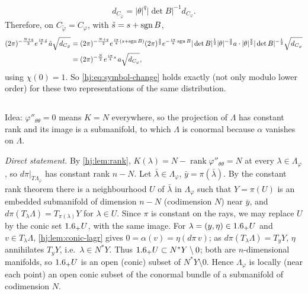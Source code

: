 \begin{equation*}
d_{C_{\tilde\varphi}}=|\theta|^q|\det B|^{-1}d_{C_\varphi}.
\end{equation*}
Therefore, on $C_{\tilde\varphi}=C_\varphi$, with $\tilde s=s+\operatorname{sgn} B$,
\begin{align*}
(2\pi)^{-\frac{N+q}2}e^{\frac{i\pi}4\tilde s}\,\tilde a\sqrt{d_{C_{\tilde\varphi}}}
&=(2\pi)^{-\frac{N+q}2}e^{\frac{i\pi}4(s+\operatorname{sgn} B)}(2\pi)^{\frac q2}e^{-\frac{i\pi}4\operatorname{sgn} B}
|\det B|^{\frac12}|\theta|^{-\frac q2}a\cdot|\theta|^{\frac q2}|\det B|^{-\frac12}
\sqrt{d_{C_\varphi}}\\
&=(2\pi)^{-\frac N2}e^{\frac{i\pi}4s}\,a\sqrt{d_{C_\varphi}},
\end{align*}
using $\chi(0)=1$. So \eqref{hj:eq:symbol-change} holds exactly (not only modulo lower order)
for these two representations of the same distribution.

\subsection*{}
Idea: $\varphi''_{\theta\theta}=0$ means $K=N$ everywhere, so the projection of $\Lambda$ has
constant rank and its image is a submanifold, to which $\Lambda$ is conormal because $\alpha$
vanishes on $\Lambda$.

\emph{Direct statement.} By \cref{hj:lem:rank}, $K(\lambda)=N-\operatorname{rank}\varphi''_{
\theta\theta}=N$ at every $\lambda\in\Lambda_\varphi$, so $d\pi|_{T\Lambda_\varphi}$ has
constant rank $n-N$. Let $\bar\lambda\in\Lambda_\varphi$, $\bar y=\pi(\bar\lambda)$. By the
constant rank theorem there is a neighbourhood $U$ of $\bar\lambda$ in $\Lambda_\varphi$ such
that $Y=\pi(U)$ is an embedded submanifold of dimension $n-N$ (codimension $N$) near $\bar y$,
and $d\pi(T_\lambda\Lambda)=T_{\pi(\lambda)}Y$ for $\lambda\in U$. Since $\pi$ is constant on
the rays, we may replace $U$ by the conic set $1.6_+U$, with the same image. For $\lambda=
(y,\eta)\in1.6_+U$ and $v\in T_\lambda\Lambda$, \cref{hj:lem:conic-lagr} gives
$0=\alpha(v)=\eta(d\pi\,v)$; as $d\pi(T_\lambda\Lambda)=T_yY$, $\eta$ annihilates $T_yY$, i.e.\
$\lambda\in N^*Y$. Thus $1.6_+U\subset N^*Y\setminus0$; both are $n$-dimensional manifolds, so
$1.6_+U$ is an open (conic) subset of $N^*Y\setminus0$. Hence $\Lambda_\varphi$ is locally (near
each point) an open conic subset of the conormal bundle of a submanifold of codimension $N$.

